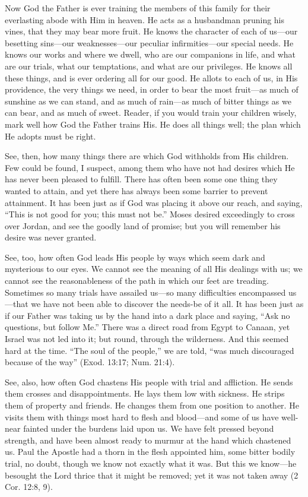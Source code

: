 \documentclass[
]{book}
\begin{document}
Now God the Father is ever training the members of this family for their everlasting abode with Him in heaven. He acts as a husbandman pruning his vines, that they may bear more fruit. He knows the character of each of us---our besetting sins---our weaknesses---our peculiar infirmities---our special needs. He knows our works and where we dwell, who are our companions in life, and what are our trials, what our temptations, and what are our privileges. He knows all these things, and is ever ordering all for our good. He allots to each of us, in His providence, the very things we need, in order to bear the most fruit---as much of sunshine as we can stand, and as much of rain---as much of bitter things as we can bear, and as much of sweet. Reader, if you would train your children wisely, mark well how God the Father trains His. He does all things well; the plan which He adopts must be right.

See, then, how many things there are which God withholds from His children. Few could be found, I suspect, among them who have not had desires which He has never been pleased to fulfill. There has often been some one thing they wanted to attain, and yet there has always been some barrier to prevent attainment. It has been just as if God was placing it above our reach, and saying, ``This is not good for you; this must not be.'' Moses desired exceedingly to cross over Jordan, and see the goodly land of promise; but you will remember his desire was never granted.

See, too, how often God leads His people by ways which seem dark and mysterious to our eyes. We cannot see the meaning of all His dealings with us; we cannot see the reasonableness of the path in which our feet are treading. Sometimes so many trials have assailed us---so many difficulties encompassed us---that we have not been able to discover the needs-be of it all. It has been just as if our Father was taking us by the hand into a dark place and saying, ``Ask no questions, but follow Me.'' There was a direct road from Egypt to Canaan, yet Israel was not led into it; but round, through the wilderness. And this seemed hard at the time. ``The soul of the people,'' we are told, ``was much discouraged because of the way'' (Exod. 13:17; Num. 21:4).

See, also, how often God chastens His people with trial and affliction. He sends them crosses and disappointments. He lays them low with sickness. He strips them of property and friends. He changes them from one position to another. He visits them with things most hard to flesh and blood---and some of us have well-near fainted under the burdens laid upon us. We have felt pressed beyond strength, and have been almost ready to murmur at the hand which chastened us. Paul the Apostle had a thorn in the flesh appointed him, some bitter bodily trial, no doubt, though we know not exactly what it was. But this we know---he besought the Lord thrice that it might be removed; yet it was not taken away (2 Cor. 12:8, 9).
\end{document}
